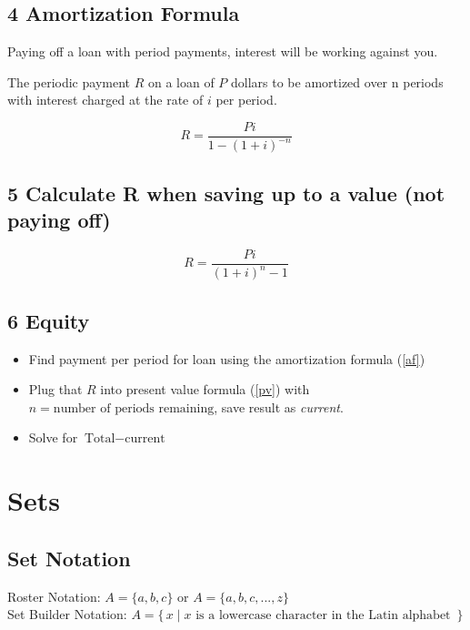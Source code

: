 \documentclass[twocolumn]{article}
\begin{document}
	\subsection*{4 Amortization Formula}
	Paying off a loan with period payments, interest will be working against you.
	
	The periodic payment $R$ on a loan of $P$ dollars to be amortized over n periods with interest charged at the rate of $i$ per period.
	
	\begin{equation} \label{af}
		R = \frac{Pi}{1-(1+i)^{-n}}
	\end{equation}
	
	\subsection*{5 Calculate R when saving up to a value (not paying off)}
	
	\begin{equation}
		R = \frac{Pi}{(1+i)^n-1}
	\end{equation}
	
	\subsection*{6 Equity}
	
	\begin{itemize}[label=--]
		\item Find payment per period for loan using the amortization formula (\ref{af})
		\item Plug that $R$ into present value formula (\ref{pv}) with $n = \text{number of periods remaining}$, save result as \emph{current}.
		\item Solve for $\text{Total} - \text{current}$
	\end{itemize}
	
	\section{Sets}
	\maketitle{}
	
	\subsection*{}
	
	\subsection*{Set Notation}
	Roster Notation: $ A = \{ a, b, c \} $ or $ A = \{ a, b, c, ..., z \} $ \\
	Set Builder Notation: $ A = \{\,x \mid x \text{ is a lowercase character in the Latin alphabet }\,\}$
	
\end{document}
